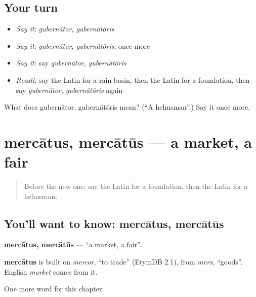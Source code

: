 \subsection*{Your turn}
\begin{itemize}
\raggedright
  \item \emph{Say it:} \emph{gubernātor, gubernātōris}
  \item \emph{Say it:} \emph{gubernātor, gubernātōris}, once more
  \item \emph{Say it:} say \emph{gubernātor, gubernātōris}
  \item \emph{Recall:} say the Latin for a rain basin, then the Latin for a foundation, then say \emph{gubernātor, gubernātōris} again
\end{itemize}

\begin{tcolorbox}[breakable,colback=teal!4,colframe=teal!35!black,title={Before you move on}]
What does gubernātor, gubernātōris mean? (\textquotedblleft{}A helmsman\textquotedblright{}.) Say it once more.
\end{tcolorbox}
\section[mercātus, mercātūs]{mercātus, mercātūs — a market, a fair}

\label{lesson:LA-C186-mercatus}



\begin{quote}
Before the new one: say the Latin for a foundation, then the Latin for a helmsman.
\end{quote}

\subsection*{You'll want to know: mercātus, mercātūs}
\textbf{mercātus, mercātūs} — \textquotedblleft{}a market, a fair\textquotedblright{}.

\begin{cousinweb}
\textbf{mercātus} is built on \emph{mercor}, \textquotedblleft{}to trade\textquotedblright{} (EtymDB 2.1), from \emph{merx}, \textquotedblleft{}goods\textquotedblright{}. English \emph{market} comes from it.
\end{cousinweb}

\begin{grammarlens}[title={What you've built}]
One more word for this chapter.
\end{grammarlens}

